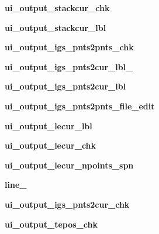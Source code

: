 \begin{DoxyCompactItemize}
\item 
\hypertarget{a00075_a60d8702dcef7ca077c25402d981a2ba9}{}\label{a00075_a60d8702dcef7ca077c25402d981a2ba9} 
{\bfseries ui\+\_\+output\+\_\+stackcur\+\_\+chk}
\item 
\hypertarget{a00075_abd1aece55a53a090e79fd1a7449d67b8}{}\label{a00075_abd1aece55a53a090e79fd1a7449d67b8} 
{\bfseries ui\+\_\+output\+\_\+stackcur\+\_\+lbl}
\item 
\hypertarget{a00075_a02aad1387d04c6ec5ad12e80a6a59d08}{}\label{a00075_a02aad1387d04c6ec5ad12e80a6a59d08} 
{\bfseries ui\+\_\+output\+\_\+igs\+\_\+pnts2pnts\+\_\+chk}
\item 
\hypertarget{a00075_a9a3e7b7353a08d8254630806f3466fc3}{}\label{a00075_a9a3e7b7353a08d8254630806f3466fc3} 
{\bfseries ui\+\_\+output\+\_\+igs\+\_\+pnts2cur\+\_\+lbl\+\_}
\item 
\hypertarget{a00075_a3a6ca0d33559a544c30ca69a584f5fb3}{}\label{a00075_a3a6ca0d33559a544c30ca69a584f5fb3} 
{\bfseries ui\+\_\+output\+\_\+igs\+\_\+pnts2cur\+\_\+lbl}
\item 
\hypertarget{a00075_acdf536fc7b4d652bfde2a129ac63af81}{}\label{a00075_acdf536fc7b4d652bfde2a129ac63af81} 
{\bfseries ui\+\_\+output\+\_\+igs\+\_\+pnts2pnts\+\_\+file\+\_\+edit}
\item 
\hypertarget{a00075_a47f948d0d305ed25b5d4199199348306}{}\label{a00075_a47f948d0d305ed25b5d4199199348306} 
{\bfseries ui\+\_\+output\+\_\+lecur\+\_\+lbl}
\item 
\hypertarget{a00075_af26afcf143419489f7a9c388f242550b}{}\label{a00075_af26afcf143419489f7a9c388f242550b} 
{\bfseries ui\+\_\+output\+\_\+lecur\+\_\+chk}
\item 
\hypertarget{a00075_afccfcfd87634348612a93710d25902d6}{}\label{a00075_afccfcfd87634348612a93710d25902d6} 
{\bfseries ui\+\_\+output\+\_\+lecur\+\_\+npoints\+\_\+spn}
\item 
\hypertarget{a00075_a9b081326a67dee3b6ab18d2aa0937b1a}{}\label{a00075_a9b081326a67dee3b6ab18d2aa0937b1a} 
{\bfseries line\+\_}
\item 
\hypertarget{a00075_a550f0dbb76e9a3094c1e38b46f5d885d}{}\label{a00075_a550f0dbb76e9a3094c1e38b46f5d885d} 
{\bfseries ui\+\_\+output\+\_\+igs\+\_\+pnts2cur\+\_\+chk}
\item 
\hypertarget{a00075_a1fd1e46b01841149ab493b773c6ee08c}{}\label{a00075_a1fd1e46b01841149ab493b773c6ee08c} 
{\bfseries ui\+\_\+output\+\_\+tepos\+\_\+chk}
\item 
\hypertarget{a00075_afc059e5843391ef3e3c56edb1f201cc0}{}\label{a00075_afc059e5843391ef3e3c56edb1f201cc0} 

\end{DoxyCompactItemize}
